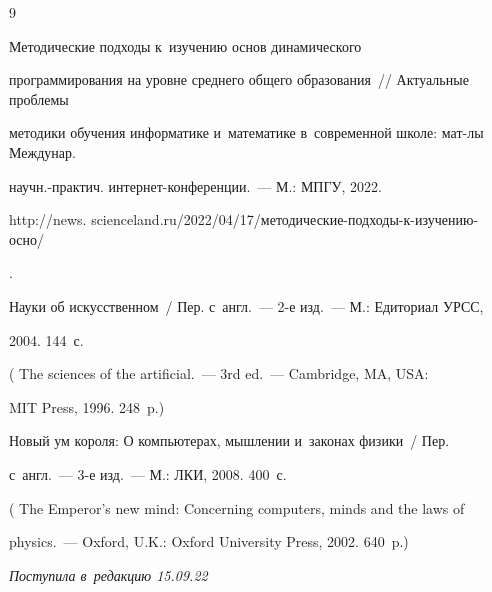 {{\begin{thebibliography}{9}


 Методические подходы к~изучению основ динамического 


программирования на уровне среднего общего образования~/\!\!/ Актуальные проб\-ле\-мы 


методики обучения информатике и~математике в~современной школе: мат-лы Междунар. 


научн.-практич. ин\-тер\-нет-кон\-фе\-рен\-ции.~--- М.: МПГУ, 2022. {\sf 


http://news. scienceland.ru/2022/04/17/методические-подходы-к-изучению-осно/}.




 Науки об искусственном~/ Пер. с~англ.~--- 2-е изд.~--- М.: Едиториал УРСС, 


2004. 144~с. 


( The sciences of the artificial.~--- 3rd ed.~--- Cambridge, MA, USA: 


MIT Press, 1996. 248~p.)







 Новый ум короля: О компьютерах, мышлении и~законах физики~/ Пер. 


с~англ.~--- 3-е изд.~--- М.: ЛКИ, 2008. 400~с.


( The Emperor's new mind: Concerning computers, minds and the laws of 


physics.~--- Oxford, U.K.: Oxford University Press, 2002. 640~p.)





 \end{thebibliography}


} }











\vspace*{-6pt}





\hfill{\small\textit{Поступила в~редакцию 15.09.22}}










